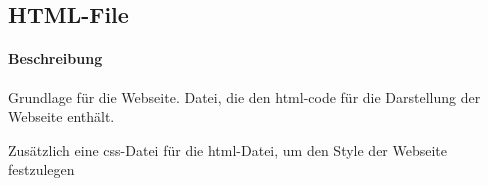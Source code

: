 \subsection{HTML-File}

\paragraph{Beschreibung}
Grundlage für die Webseite.
Datei, die den html-code für die Darstellung der Webseite enthält.

Zusätzlich eine css-Datei für die html-Datei, um den Style der Webseite festzulegen